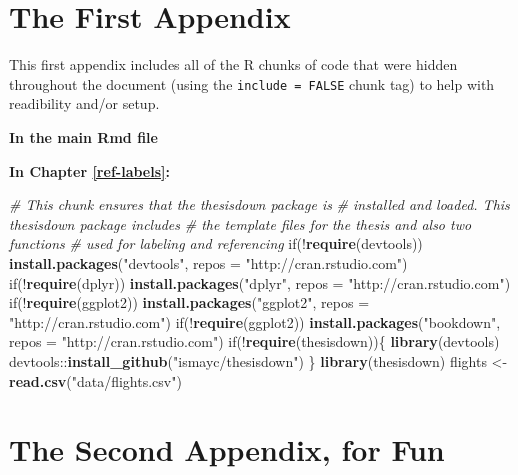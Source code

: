 \documentclass[12pt,twoside]{reedthesis}
\newenvironment{Shaded}{\begin{snugshade}}{\end{snugshade}}
\newcommand{\KeywordTok}[1]{\textcolor[rgb]{0.13,0.29,0.53}{\textbf{{#1}}}}
\newcommand{\DataTypeTok}[1]{\textcolor[rgb]{0.13,0.29,0.53}{{#1}}}
\newcommand{\StringTok}[1]{\textcolor[rgb]{0.31,0.60,0.02}{{#1}}}
\newcommand{\CommentTok}[1]{\textcolor[rgb]{0.56,0.35,0.01}{\textit{{#1}}}}
\newcommand{\NormalTok}[1]{{#1}}
\theoremstyle{definition}
\theoremstyle{definition}
\theoremstyle{definition}
\theoremstyle{remark}
\begin{document}
\appendix

\chapter{The First Appendix}\label{the-first-appendix}

This first appendix includes all of the R chunks of code that were
hidden throughout the document (using the \texttt{include\ =\ FALSE}
chunk tag) to help with readibility and/or setup.

\textbf{In the main Rmd file}

\textbf{In Chapter \ref{ref-labels}:}
\begin{Shaded}
\begin{Highlighting}[]
\CommentTok{# This chunk ensures that the thesisdown package is}
\CommentTok{# installed and loaded. This thesisdown package includes}
\CommentTok{# the template files for the thesis and also two functions}
\CommentTok{# used for labeling and referencing}
\NormalTok{if(!}\KeywordTok{require}\NormalTok{(devtools))}
  \KeywordTok{install.packages}\NormalTok{(}\StringTok{"devtools"}\NormalTok{, }\DataTypeTok{repos =} \StringTok{"http://cran.rstudio.com"}\NormalTok{)}
\NormalTok{if(!}\KeywordTok{require}\NormalTok{(dplyr))}
    \KeywordTok{install.packages}\NormalTok{(}\StringTok{"dplyr"}\NormalTok{, }\DataTypeTok{repos =} \StringTok{"http://cran.rstudio.com"}\NormalTok{)}
\NormalTok{if(!}\KeywordTok{require}\NormalTok{(ggplot2))}
    \KeywordTok{install.packages}\NormalTok{(}\StringTok{"ggplot2"}\NormalTok{, }\DataTypeTok{repos =} \StringTok{"http://cran.rstudio.com"}\NormalTok{)}
\NormalTok{if(!}\KeywordTok{require}\NormalTok{(ggplot2))}
    \KeywordTok{install.packages}\NormalTok{(}\StringTok{"bookdown"}\NormalTok{, }\DataTypeTok{repos =} \StringTok{"http://cran.rstudio.com"}\NormalTok{)}
\NormalTok{if(!}\KeywordTok{require}\NormalTok{(thesisdown))\{}
  \KeywordTok{library}\NormalTok{(devtools)}
  \NormalTok{devtools::}\KeywordTok{install_github}\NormalTok{(}\StringTok{"ismayc/thesisdown"}\NormalTok{)}
  \NormalTok{\}}
\KeywordTok{library}\NormalTok{(thesisdown)}
\NormalTok{flights <-}\StringTok{ }\KeywordTok{read.csv}\NormalTok{(}\StringTok{"data/flights.csv"}\NormalTok{)}
\end{Highlighting}
\end{Shaded}
\chapter{The Second Appendix, for
Fun}\label{the-second-appendix-for-fun}
\end{document}
